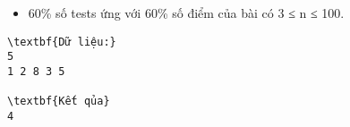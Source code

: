\begin{itemize}
	\item 60\% số tests ứng với 60\% số điểm của bài có 3 ≤ n ≤ 100.
\end{itemize}
\begin{verbatim}
\textbf{Dữ liệu:}
5
1 2 8 3 5

\textbf{Kết qủa}
4
\end{verbatim}